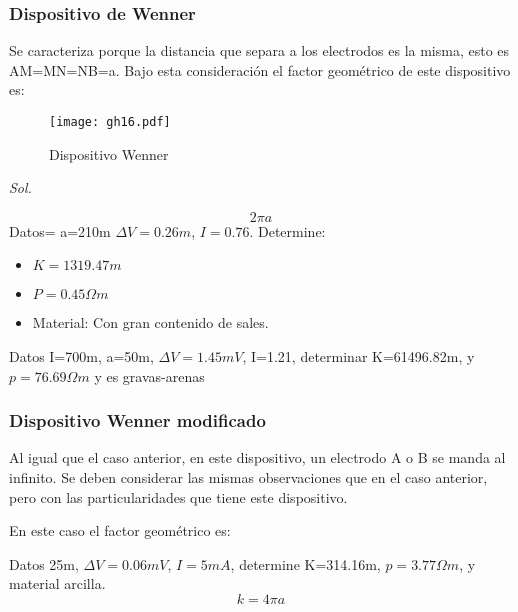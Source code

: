 \subsubsection{Dispositivo de Wenner}
Se caracteriza porque la distancia que separa a los electrodos es la misma, esto es AM=MN=NB=a. Bajo esta consideración el factor geométrico de este dispositivo es:
\begin{figure}[h!]
\centering
  \texttt{[image: gh16.pdf]}
  \caption{Dispositivo Wenner}
  \label{gh16}
\end{figure}
\begin{problem}[Datos: a=550m $\Delta V= 9.32 mV$, $I=1.62A$, determine:]
  \textit{ Sol. }
\end{problem}
\begin{equation}
  2\pi a
\end{equation}
Datos= a=210m $\Delta V=0.26m$, $I=0.76$. Determine:
\begin{itemize}
    \item $K=1319.47m$
    \item $P=0.45\Omega m$
    \item Material: Con gran contenido de sales.
\end{itemize}

Datos I=700m, a=50m, $\Delta V=1.45mV$, I=1.21, determinar K=61496.82m, y $p=76.69\Omega m$ y es gravas-arenas
\subsubsection{Dispositivo Wenner modificado}
Al igual que el caso anterior, en este dispositivo, un electrodo A o B se manda al infinito. Se deben considerar las mismas observaciones que en el caso anterior, pero con las particularidades que tiene este dispositivo.

En este caso el factor geométrico es:

Datos 25m, $\Delta V=0.06mV$, $I=5mA$, determine K=314.16m, $p=3.77\Omega m$, y material arcilla.
\begin{equation}
    k = 4\pi a
\end{equation}
